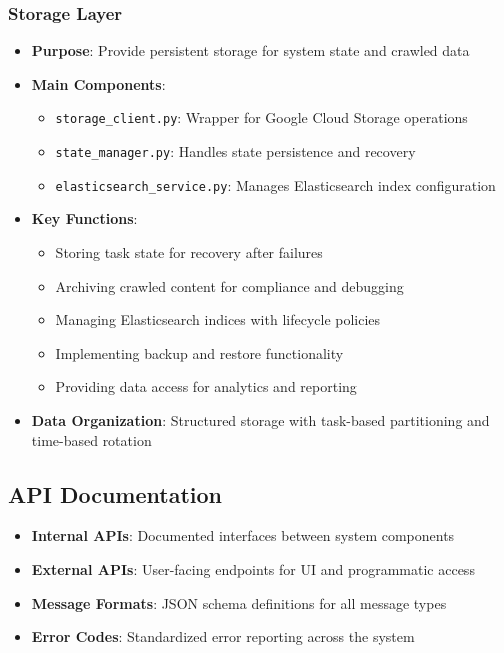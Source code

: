 \documentclass[12pt,a4paper]{report}
\begin{document}
\subsubsection{Storage Layer}
\begin{itemize}
    \item \textbf{Purpose}: Provide persistent storage for system state and crawled data
    \item \textbf{Main Components}:
    \begin{itemize}
        \item \texttt{storage\_client.py}: Wrapper for Google Cloud Storage operations
        \item \texttt{state\_manager.py}: Handles state persistence and recovery
        \item \texttt{elasticsearch\_service.py}: Manages Elasticsearch index configuration
    \end{itemize}
    \item \textbf{Key Functions}:
    \begin{itemize}
        \item Storing task state for recovery after failures
        \item Archiving crawled content for compliance and debugging
        \item Managing Elasticsearch indices with lifecycle policies
        \item Implementing backup and restore functionality
        \item Providing data access for analytics and reporting
    \end{itemize}
    \item \textbf{Data Organization}: Structured storage with task-based partitioning and time-based rotation
\end{itemize}

\subsection{API Documentation}
\begin{itemize}
    \item \textbf{Internal APIs}: Documented interfaces between system components
    \item \textbf{External APIs}: User-facing endpoints for UI and programmatic access
    \item \textbf{Message Formats}: JSON schema definitions for all message types
    \item \textbf{Error Codes}: Standardized error reporting across the system
\end{itemize}
\end{document}

